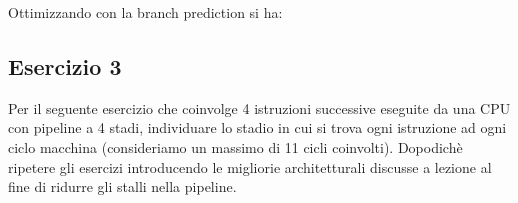 \documentclass[a4paper]{article}
\theoremstyle{break}
\theoremstyle{break}
\theoremstyle{break}
\theoremstyle{break}
\begin{document}
\begin{table}[H]
  \centering
\end{table}

\vspace{1em}
\noindent Ottimizzando con la branch prediction si ha:
\begin{table}[H]
  \centering
\end{table}

\subsection{Esercizio 3}
Per il seguente esercizio che coinvolge 4 istruzioni successive eseguite da una CPU con pipeline a 4 stadi, individuare lo stadio in cui si trova ogni istruzione ad ogni ciclo macchina (consideriamo un massimo di 11 cicli coinvolti).
Dopodichè ripetere gli esercizi introducendo le migliorie architetturali discusse a lezione al fine di ridurre gli stalli nella pipeline.
\end{document}
